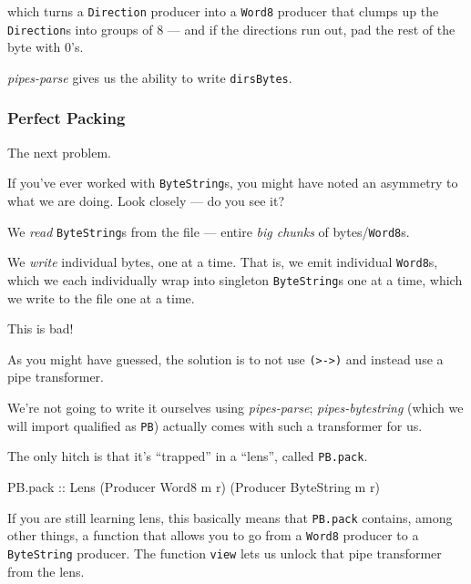 \documentclass[]{article}
\newenvironment{Shaded}{}{}
\newcommand{\DataTypeTok}[1]{\textcolor[rgb]{0.56,0.13,0.00}{#1}}
\newcommand{\NormalTok}[1]{#1}
\newcommand{\OtherTok}[1]{\textcolor[rgb]{0.00,0.44,0.13}{#1}}
\begin{document}
which turns a \texttt{Direction} producer into a \texttt{Word8} producer that
clumps up the \texttt{Direction}s into groups of 8 --- and if the directions run
out, pad the rest of the byte with 0's.

\emph{pipes-parse} gives us the ability to write \texttt{dirsBytes}.

\hypertarget{perfect-packing}{%
\subsubsection{Perfect Packing}\label{perfect-packing}}

The next problem.

If you've ever worked with \texttt{ByteString}s, you might have noted an
asymmetry to what we are doing. Look closely --- do you see it?

We \emph{read} \texttt{ByteString}s from the file --- entire \emph{big chunks}
of bytes/\texttt{Word8}s.

We \emph{write} individual bytes, one at a time. That is, we emit individual
\texttt{Word8}s, which we each individually wrap into singleton
\texttt{ByteString}s one at a time, which we write to the file one at a time.

This is bad!

As you might have guessed, the solution is to not use
\texttt{(\textgreater{}-\textgreater{})} and instead use a pipe transformer.

We're not going to write it ourselves using \emph{pipes-parse};
\emph{pipes-bytestring} (which we will import qualified as \texttt{PB}) actually
comes with such a transformer for us.

The only hitch is that it's ``trapped'' in a ``lens'', called \texttt{PB.pack}.

\begin{Shaded}
\begin{Highlighting}[]
\NormalTok{PB.pack}\OtherTok{ ::} \DataTypeTok{Lens\textquotesingle{}}\NormalTok{ (}\DataTypeTok{Producer} \DataTypeTok{Word8}\NormalTok{ m r) (}\DataTypeTok{Producer} \DataTypeTok{ByteString}\NormalTok{ m r)}
\end{Highlighting}
\end{Shaded}

If you are still learning lens, this basically means that \texttt{PB.pack}
contains, among other things, a function that allows you to go from a
\texttt{Word8} producer to a \texttt{ByteString} producer. The function
\texttt{view} lets us unlock that pipe transformer from the lens.
\end{document}
